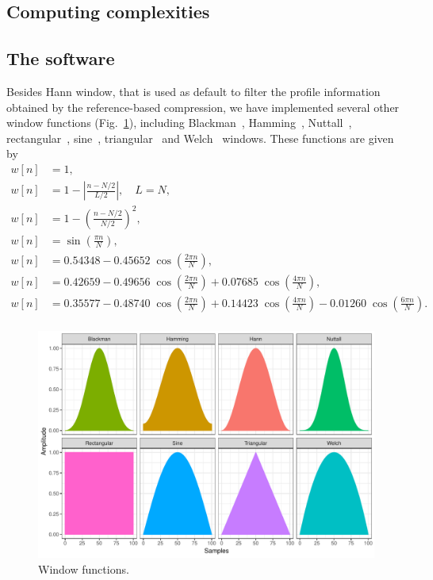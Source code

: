 \subsection{Computing complexities}

\subsection{The software}
\label{subsec.software}

Besides Hann window, that is used as default to filter the profile information obtained by the reference-based compression, we have implemented several other window functions (Fig.~\ref{fig.filters}), including Blackman~\cite{blackman1959particular}, Hamming~\cite{tukey1949measuring}, Nuttall~\cite{nuttall1981some}, rectangular~\cite{oppenheim1999discrete}, sine~\cite{harris1978use}, triangular~\cite{bartlett1950periodogram} and Welch~\cite{welch1967use} windows. These functions are given by
\begin{align}
  w[n] &= 1,
  \tag*{(rectangular)} \\
  w[n] &= 1-\left|\tfrac {n-N/2}{L/2}\right|, \quad L=N,
  \tag*{(triangular/Bartlett)} \\
  w[n] &= 1-\left(\tfrac {n-N/2}{N/2}\right)^{2},
  \tag*{(Welch)} \\
  w[n] &= \sin \left(\tfrac {\pi n}{N}\right),
  \tag*{(sine)} \\
  w[n] &= 0.54348-0.45652\;\cos \left(\tfrac {2\pi n}{N}\right),
  \tag*{(Hamming)} \\
  w[n] &= 0.42659-0.49656\;\cos \left(\tfrac {2\pi n}{N}\right)+0.07685\;\cos \left(\tfrac {4\pi n}{N}\right),
  \tag*{(Blackman)} \\
  w[n] &= 0.35577-0.48740\;\cos \left(\tfrac {2\pi n}{N}\right)+0.14423\;\cos \left(\tfrac {4\pi n}{N}\right)-0.01260\;\cos \left(\tfrac {6\pi n}{N}\right).
  \tag*{(Nuttall)} \\
\end{align}

\begin{figure}[!h]
  \centering
\includegraphics[width=.95\linewidth]{filters.pdf}
\caption{Window functions.}
\label{fig.filters}
\end{figure}